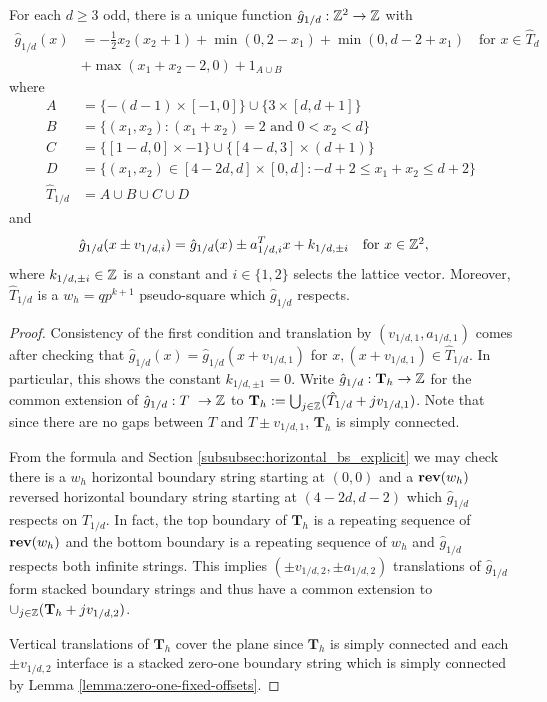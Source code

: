 \documentclass[12pt]{amsart}
\begin{document}
\begin{lemma} \label{lemma:basecase_3k_even_alt}
	For each $d \geq 3$ odd, there is a unique function $\hat{g}_{1/d}: \mathbb{Z}^2 \to \mathbb{Z}$ with 
	\begin{align*}
	\hat{g}_{1/d}(x) &= -\frac{1}{2} x_2 (x_2 + 1)  + \min(0, 2 - x_1) + \min(0, d-2 + x_1)  \quad \mbox{for  $x \in \hat{T}_d$}\\
	&+ \max(x_1+x_2-2,0) + 1_{A \cup B} 
	\end{align*}
	where 
	\begin{align*}
	A &= \{ -(d-1) \times [-1,0]\} \cup \{ 3 \times [d,d+1]\} \\
	B &=  \{ (x_1,x_2) :  (x_1+x_2) = 2 \mbox{ and } 0 < x_2 < d \}    \\ 
	C &= \{  [1-d,0] \times -1  \} \cup \{ [4-d,3] \times (d+1) \} \\ 
	D&=  \{ (x_1, x_2) \in [ 4-2d, d] \times [0, d]:  -d + 2 \leq x_1 + x_2 \leq d+2 \}  \\
	\hat{T}_{1/d} &=  A \cup B \cup C \cup D
	\end{align*}
	and
	\[
	\begin{aligned}
	\hat{g}_{1/d}(x \pm v_{1/d,i}) &= \hat{g}_{1/d}(x) \pm a_{1/d,i}^T x + k_{1/d,\pm i}  \quad \mbox{for $x \in \mathbb{Z}^2$},
	\end{aligned}
	\]
	where $k_{1/d,\pm i} \in \mathbb{Z}$ is a constant and $i \in \{1,2\}$ selects the lattice vector.
	Moreover, $\hat{T}_{1/d}$ is a $w_h = q p^{k+1}$ pseudo-square which $\hat{g}_{1/d}$ respects. 
\end{lemma}
\begin{proof}
	Consistency of the first condition and translation by $(v_{1/d,1}, a_{1/d,1})$ comes after checking that
	$\hat{g}_{1/d}(x) = \hat{g}_{1/d}(x + v_{1/d,1})$ for $x, (x+ v_{1/d,1}) \in \hat{T}_{1/d}$. In particular, this shows the constant 
	$k_{1/d,\pm 1} = 0$. Write $\hat{g}_{1/d}: \mathbf{T}_h \to \mathbb{Z}$ for the common extension of $\hat{g}_{1/d}:T\ \to \mathbb{Z}$
	to $\mathbf{T}_h := \bigcup_{j \in \mathbb{Z}} (\hat T_{1/d} + j v_{1/d,1})$. Note that since there are no gaps between $T$ and $T \pm v_{1/d,1}$, 
	$\mathbf{T}_h$ is simply connected. 
	
	
	From the formula and Section \ref{subsubsec:horizontal_bs_explicit} we may check there is a $w_h$ horizontal boundary string starting at $(0,0)$ and a $\mathop{\bf rev}(w_h)$ reversed horizontal boundary string starting at $(4-2d,d-2)$ which $\hat{g}_{1/d}$ respects on $T_{1/d}$. In fact, the top boundary of $\mathbf{T}_h$ is a repeating sequence of $\mathop{\bf rev}(w_h)$ and the bottom boundary 
	is a repeating sequence of $w_h$ and $\hat{g}_{1/d}$ respects both infinite strings. This implies $( \pm v_{1/d,2}, \pm a_{1/d,2})$ translations of $\hat{g}_{1/d}$ form stacked boundary strings and thus have a common extension to $\cup_{j \in \mathbb{Z}} (\mathbf{T}_{h} + j v_{1/d,2})$. 
	
	Vertical translations of $\mathbf{T}_{h}$ cover the plane since $\mathbf{T}_{h}$ is simply connected and each $\pm v_{1/d,2}$ interface is a stacked zero-one boundary string which is simply connected by Lemma \ref{lemma:zero-one-fixed-offsets}. 
\end{proof}
\end{document}
